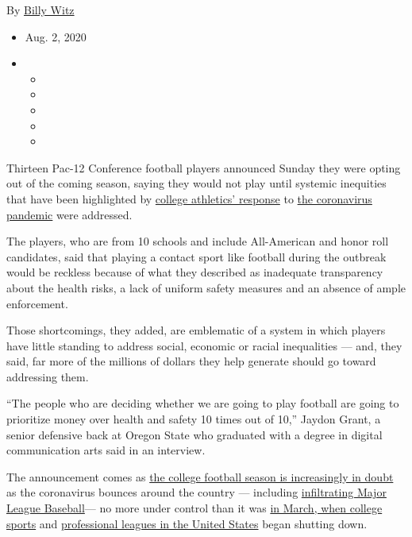 By \href{https://www.nytimes3xbfgragh.onion/by/billy-witz}{Billy Witz}

\begin{itemize}
\item
  Aug. 2, 2020
\item
  \begin{itemize}
  \item
  \item
  \item
  \item
  \item
  \end{itemize}
\end{itemize}

Thirteen Pac-12 Conference football players announced Sunday they were
opting out of the coming season, saying they would not play until
systemic inequities that have been highlighted by
\href{https://www.nytimes3xbfgragh.onion/2020/07/16/sports/ncaafootball/ncaa-guidelines-fall-sports.html}{college
athletics' response} to
\href{https://www.nytimes3xbfgragh.onion/news-event/coronavirus}{the
coronavirus pandemic} were addressed.

The players, who are from 10 schools and include All-American and honor
roll candidates, said that playing a contact sport like football during
the outbreak would be reckless because of what they described as
inadequate transparency about the health risks, a lack of uniform safety
measures and an absence of ample enforcement.

Those shortcomings, they added, are emblematic of a system in which
players have little standing to address social, economic or racial
inequalities --- and, they said, far more of the millions of dollars
they help generate should go toward addressing them.

``The people who are deciding whether we are going to play football are
going to prioritize money over health and safety 10 times out of 10,''
Jaydon Grant, a senior defensive back at Oregon State who graduated with
a degree in digital communication arts said in an interview.

The announcement comes as
\href{https://www.nytimes3xbfgragh.onion/2020/07/10/sports/ncaafootball/coronavirus-college-football-season-canceled.html}{the
college football season is increasingly in doubt} as the coronavirus
bounces around the country --- including
\href{https://www.nytimes3xbfgragh.onion/2020/08/01/sports/baseball/coronavirus-cardinals.html}{infiltrating
Major League Baseball}--- no more under control than it was
\href{https://www.nytimes3xbfgragh.onion/2020/03/12/sports/ncaabasketball/ncaa-basketball-tournament-coronavirus.html}{in
March, when college sports} and
\href{https://www.nytimes3xbfgragh.onion/2020/03/12/sports/coronavirus-sports-canceled.html}{professional
leagues in the United States} began shutting down.


